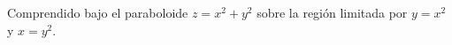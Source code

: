 \item Comprendido bajo el paraboloide $z = x^2 + y^2$ sobre la región limitada por $y = x^2$ y $x = y^2$.
